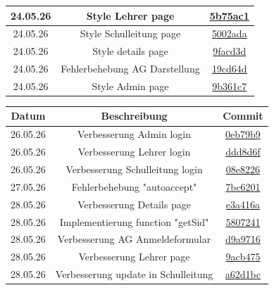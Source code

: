 \begin{center}
\begin{tabular}{| c | c | c |}
		\hline
		24.05.26 & Style Lehrer page & \href{https://github.com/Sobottasgithub/AG-Verwaltung/commit/5b75ac1dbb38468ac5af2f488972ff312f3747df}{5b75ac1}\\
		\hline
		24.05.26 & Style Schulleitung page & \href{https://github.com/Sobottasgithub/AG-Verwaltung/commit/5002adab46a29ccffeaa0e3b5eb847d342f9c7a3}{5002ada}\\
		\hline
		24.05.26 & Style details page & \href{https://github.com/Sobottasgithub/AG-Verwaltung/commit/9facd3d6bbe51896078fd6ce5c54a3df8b7a5129}{9facd3d}\\
		\hline
		24.05.26 & Fehlerbehebung AG Darstellung & \href{https://github.com/Sobottasgithub/AG-Verwaltung/commit/19cd64d174591d943255141e20b8f6e276c5ef3c}{19cd64d}\\
		\hline
		24.05.26 & Style Admin page & \href{https://github.com/Sobottasgithub/AG-Verwaltung/commit/9b361c7e7a7d47ab7af377b25e913a0ef8edf988}{9b361c7}\\
		\hline
	\end{tabular}
\end{center}
\newpage
\begin{center}
	\begin{tabular}{| c | c | c |}
		\hline
		Datum & Beschreibung & Commit \\[0.5ex]
		\hline\hline
		26.05.26 & Verbesserung Admin login & \href{https://github.com/Sobottasgithub/AG-Verwaltung/commit/0eb79b9c53cc3d08850428cf9b4ff0b45fd7d0f4}{0eb79b9}\\
		\hline
		26.05.26 & Verbesserung Lehrer login & \href{https://github.com/Sobottasgithub/AG-Verwaltung/commit/ddd8d6ffbaeb9c16739f59f2923a275108cd72ad}{ddd8d6f}\\
		\hline
		26.05.26 & Verbesserung Schulleitung login & \href{https://github.com/Sobottasgithub/AG-Verwaltung/commit/08e8226e4bef44813fc6532a341ceb75c8d88f06}{08e8226}\\
		\hline
		27.05.26 & Fehlerbehebung "autoaccept" & \href{https://github.com/Sobottasgithub/AG-Verwaltung/commit/7bc6201110c4d5b765793a1a99553bf04cd4b25a}{7bc6201}\\
		\hline
		28.05.26 & Verbesserung Details page & \href{https://github.com/Sobottasgithub/AG-Verwaltung/commit/e3a416a278000ac60781a7e1fbf8037e765863b0}{e3a416a}\\
		\hline
		28.05.26 & Implementierung function "getSid" & \href{https://github.com/Sobottasgithub/AG-Verwaltung/commit/5807241541fbcd68f8e2fd1315aef892937e48e9}{5807241}\\
		\hline
		28.05.26 & Verbesserung AG Anmeldeformular & \href{https://github.com/Sobottasgithub/AG-Verwaltung/commit/d9a97168d17f7beb5f1bfe629f724dcd12ef4ec0}{d9a9716}\\
		\hline
		28.05.26 & Verbesserung Lehrer page & \href{https://github.com/Sobottasgithub/AG-Verwaltung/commit/9acb4759500a85ef9f1be87b44a8678c74f73713}{9acb475}\\
		\hline
		28.05.26 & Verbesserung update in Schulleitung & \href{https://github.com/Sobottasgithub/AG-Verwaltung/commit/a62d1bc5feb33645c49e183774493c5663207dc5}{a62d1bc}\\
		\hline
	\end{tabular}
\end{center}
\newpage

